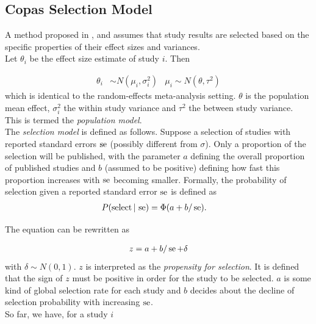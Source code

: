 \documentclass[11pt,a4paper,twoside]{book}\usepackage[]{graphicx}\usepackage[]{color}
\begin{document}
\subsection{Copas Selection Model} \label{sec:copas}

A method proposed in \citet{Copas1}, \citet{Copas2} and \citet{Copas3} assumes that study results are selected based on the specific properties of their effect sizes and variances. \\
Let $\theta_i$ be the effect size estimate of study $i$. Then 

\begin{align}
\theta_i &\sim N(\mu_i, \sigma_i^2) &
\mu_i \sim N(\theta, \tau^2) \label{eq:population.model}
\end{align}
which is identical to the random-effects meta-analysis setting. $\theta$ is the population mean effect, $\sigma_i^2$ the within study variance and $\tau^2$ the between study variance. This is termed the \textit{population model}. \\
The \textit{selection model} is defined as follows. Suppose a selection of studies with reported %
standard errors $\operatorname{se}$ (possibly different from $\sigma$). Only a proportion of the selection will be published, with the parameter $a$ defining the overall proportion of published studies and $b$ (assumed to be positive) defining how fast this proportion increases with $\operatorname{se}$ becoming smaller. Formally, the probability of selection given a reported standard error $\operatorname{se}$ is defined as
\begin{align}
P(\textrm{select}\given \se) &= \Phi(a + b/\se). \nonumber %
\end{align}

The equation can be rewritten as 

\begin{align}
z = a + b/\se + \delta \nonumber %
\end{align}
with $\delta \sim N(0,1)$. $z$ is interpreted as the \textit{propensity for selection}. It is defined that the sign of $z$ must be positive in order for the study to be selected.
$a$ is some kind of global selection rate for each study and $b$ decides about the decline of selection probability with increasing $\operatorname{se}$.\\
So far, we have, for a study $i$
\end{document}
